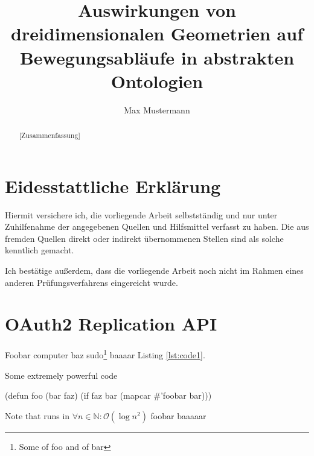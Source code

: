\documentclass{thesis}
\title{Auswirkungen von dreidimensionalen Geometrien auf Bewegungsabläufe in abstrakten Ontologien}
\author{Max Mustermann}
\begin{document}
\maketitle

\chapter*{Eidesstattliche Erklärung}

Hiermit versichere ich, die vorliegende Arbeit selbstständig und nur unter Zuhilfenahme der angegebenen Quellen und Hilfsmittel verfasst zu haben. Die aus fremden Quellen direkt oder indirekt übernommenen Stellen sind als solche kenntlich gemacht.

Ich bestätige außerdem, dass die vorliegende Arbeit noch nicht im Rahmen eines anderen Prüfungsverfahrens eingereicht wurde.

\vspace{3cm}

\dateplaceandsignature{\theauthor}

\cleardoublepage

\begin{abstract}[Zusammenfassung]
  \blindtext
\end{abstract}

\begin{abstract}
  \blindtext
\end{abstract}

\cleardoublepage

\makelists

\chapter{OAuth2 Replication API}

\blindtext

Foobar\cite{peter_norvig_kunstliche_2012} \gls{computer} baz\cite{mcdermott1991reactive} sudo\footnote{Some of foo and of bar} baaaar Listing \ref{lst:code1}.

\begin{listing}
  \caption{Some extremely powerful code}
  \label{lst:code1}
  \begin{lispcode}
(defun foo (bar faz)
  (if faz
      bar
      (mapcar #'foobar bar)))
  \end{lispcode}
\end{listing}

Note that  runs\cite{patrick_rothfuss_name_2012} in \( \forall n \in \mathbb{N}: \mathcal{O}(\log n^2) \) foobar\cite{patrick_rothfuss_furcht_2011} baaaaar\cite{patrick_rothfuss_furcht_2012}
\blindtext
\end{document}
